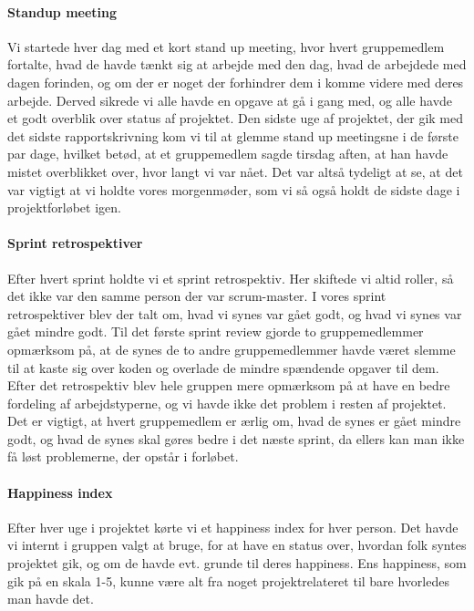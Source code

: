 \paragraph*{Standup meeting}
Vi startede hver dag med et kort stand up meeting, hvor hvert gruppemedlem fortalte, hvad de havde tænkt sig at arbejde med den dag, hvad de arbejdede med dagen forinden, og om der er noget der forhindrer dem i komme videre med deres arbejde.
Derved sikrede vi alle havde en opgave at gå i gang med, og alle havde et godt overblik over status af projektet.
Den sidste uge af projektet, der gik med det sidste rapportskrivning kom vi til at glemme stand up meetingsne i de første par dage, hvilket betød, at et gruppemedlem sagde tirsdag aften, at han havde mistet overblikket over, hvor langt vi var nået.
Det var altså tydeligt at se, at det var vigtigt at vi holdte vores morgenmøder, som vi så også holdt de sidste dage i projektforløbet igen.

\paragraph*{Sprint retrospektiver}
Efter hvert sprint holdte vi et sprint retrospektiv. Her skiftede vi altid roller, så det ikke var den samme person der var scrum-master.
I vores sprint retrospektiver blev der talt om, hvad vi synes var gået godt, og hvad vi synes var gået mindre godt.
Til det første sprint review gjorde to gruppemedlemmer opmærksom på, at de synes de to andre gruppemedlemmer havde været slemme til at kaste sig over koden og overlade de mindre spændende opgaver til dem.
Efter det retrospektiv blev hele gruppen mere opmærksom på at have en bedre fordeling af arbejdstyperne, og vi havde ikke det problem i resten af projektet.
Det er vigtigt, at hvert gruppemedlem er ærlig om, hvad de synes er gået mindre godt, og hvad de synes skal gøres bedre i det næste sprint, da ellers kan man ikke få løst problemerne, der opstår i forløbet.

\paragraph*{Happiness index}
Efter hver uge i projektet kørte vi et happiness index for hver person.
Det havde vi internt i gruppen valgt at bruge, for at have en status over, hvordan folk syntes projektet gik, og om de havde evt. grunde til deres happiness.
Ens happiness, som gik på en skala 1-5, kunne være alt fra noget projektrelateret til bare hvorledes man havde det.

